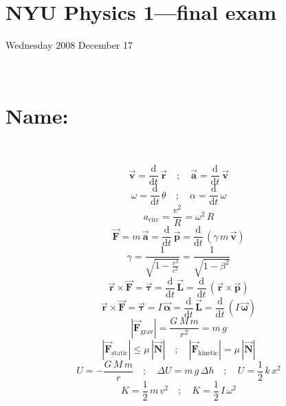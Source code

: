 \documentclass[12pt]{article}
\newcommand{\tv}[1]{\mathbf{\vec{#1}}}
\newcommand{\dd}{\mathrm{d}}
\begin{document}
\section*{NYU Physics 1---final exam}

Wednesday 2008 December 17

~ \vfill ~

\section*{Name:}

~ \vfill ~

\begin{equation}
\tv{v} = \frac{\dd}{\dd t}\,\tv{r}
\quad ; \quad
\tv{a} = \frac{\dd}{\dd t}\,\tv{v}
\end{equation}
\begin{equation}
\omega = \frac{\dd}{\dd t}\,\theta
\quad ; \quad
\alpha = \frac{\dd}{\dd t}\,\omega
\end{equation}
\begin{equation}
a_{\mathrm{circ}} = \frac{v^2}{R} = \omega^2\,R
\end{equation}
\begin{equation}
\tv{F} = m\,\tv{a}
       = \frac{\dd}{\dd t}\,\tv{p}
       = \frac{\dd}{\dd t}\,(\gamma\,m\,\tv{v})
\end{equation}
\begin{equation}
\gamma = \frac{1}{\sqrt{1 - \frac{v^2}{c^2}}}
       = \frac{1}{\sqrt{1 - \beta^2}}
\end{equation}
\begin{equation}
\tv{r}\times\tv{F} = \tv{\tau}
                   = \frac{\dd}{\dd t}\,\tv{L}
		   = \frac{\dd}{\dd t}\,(\tv{r}\times\tv{p})
\end{equation}
\begin{equation}
\tv{r}\times\tv{F} = \tv{\tau}
                   = I\,\tv{\alpha}
                   = \frac{\dd}{\dd t}\,\tv{L}
                   = \frac{\dd}{\dd t}\,(I\,\tv{\omega})
\end{equation}
\begin{equation}
|\tv{F}_{\mathrm{grav}}| = \frac{G\,M\,m}{r^2} = m\,g
\end{equation}
\begin{equation}
|\tv{F}_{\mathrm{static}}| \leq \mu\,|\tv{N}|
\quad ; \quad
|\tv{F}_{\mathrm{kinetic}}| = \mu\,|\tv{N}|
\end{equation}
\begin{equation}
U = -\frac{G\,M\,m}{r}
\quad ; \quad
\Delta U = m\,g\,\Delta h
\quad ; \quad
U = \frac{1}{2}\,k\,x^2
\end{equation}
\begin{equation}
K = \frac{1}{2}\,m\,v^2
\quad ; \quad
K = \frac{1}{2}\,I\,\omega^2
\end{equation}
\end{document}
